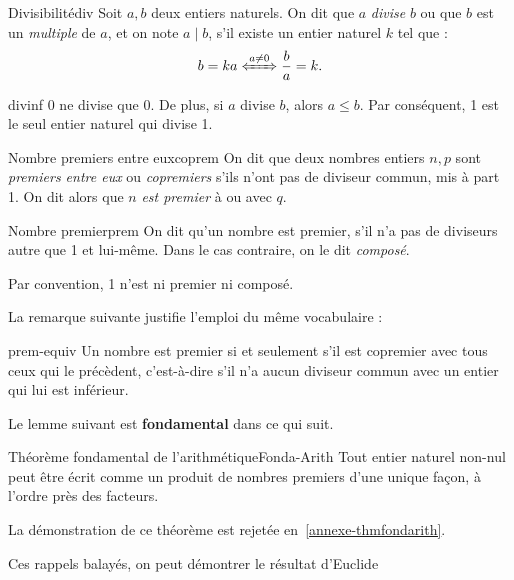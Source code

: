 \documentclass[a4paper,french]{memoir}
\begin{document}
\begin{defb}{Divisibilité}{div}
Soit $a,b$ deux entiers naturels. On dit que $a$ \emph{divise} $b$ ou que $b$ est un \emph{multiple} de $a$, et on note $a\mid b$, s'il existe un entier naturel $k$ tel que : $$b=ka \xLeftrightarrow{a \neq 0} \frac{b}{a}=k.$$
\end{defb}
\begin{remarkb}{}{divinf}
0 ne divise que 0. De plus, si $a$ divise $b$, alors $a\leq b$. Par conséquent, 1 est le seul entier naturel qui divise 1.
\end{remarkb}
\begin{defb}{Nombre premiers entre eux}{coprem}
On dit que deux nombres entiers $n,p$ sont \emph{premiers entre eux} ou \emph{copremiers} s'ils n'ont pas de diviseur commun, mis à part 1. On dit alors que $n$ \emph{est premier} à ou avec $q$.
\end{defb}
\begin{defb}{Nombre premier}{prem}
On dit qu'un nombre est premier, s'il n'a pas de diviseurs autre que 1 et lui-même. Dans le cas contraire, on le dit \emph{composé}.

Par convention\footnotemark, 1 n'est ni premier ni composé.
\end{defb}
La remarque suivante justifie l'emploi du même vocabulaire : 
\begin{remarkb}{}{prem-equiv}
Un nombre est premier si et seulement s'il est copremier avec tous ceux qui le précèdent, c'est-à-dire s'il n'a aucun diviseur commun avec un entier qui lui est inférieur. 
\end{remarkb}
\newpage
Le lemme suivant est \textbf{fondamental} dans ce qui suit.
\begin{lemmab}[saveto={premier.tex}]{Théorème fondamental de l'arithmétique}{Fonda-Arith}
  Tout entier naturel non-nul peut être écrit comme un produit de nombres premiers d'une unique façon, à l'ordre près des facteurs.
\end{lemmab}
La démonstration de ce théorème est rejetée en~\cref{annexe-thmfondarith}.

Ces rappels balayés, on peut démontrer le résultat d'Euclide 
\end{document}

